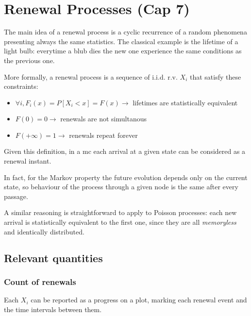 \chapter{Renewal Processes (Cap 7)}
The main idea of a renewal process is a cyclic recurrence of a random phenomena presenting always the same statistics.
The classical example is the lifetime of a light bulb: everytime a blub dies the new one experience the same conditions as the previous one.

\begin{definition}
	More formally, a renewal process is a sequence of i.i.d. r.v. $X_i$ that satisfy these constraints:

	\begin{itemize}
		\item $ \forall i, F_i(x) = P[X_i < x] = F(x) \rightarrow $ lifetimes are statistically equivalent
		\item $ F(0) = 0 \rightarrow $ renewals are not simultanous
		\item $ F(+\infty) = 1 \rightarrow $ renewals repeat forever
	\end{itemize}
\end{definition}

\begin{remark}
	Given this definition, in a \gls{mc} each arrival at a given state can be considered as a renewal instant.

	In fact, for the Markov property the future evolution depends only on the current state, so behaviour of the process through a given node is the same after every passage.
\end{remark}

\begin{remark}
	A similar reasoning is straightforward to apply to Poisson processes: each new arrival is statistically equivalent to the first one, since they are all \emph{memoryless} and identically distributed.
\end{remark}

\section{Relevant quantities}

\subsection{Count of renewals}
	Each $X_i$ can be reported as a progress on a plot, marking each renewal event and the time intervals between them.

